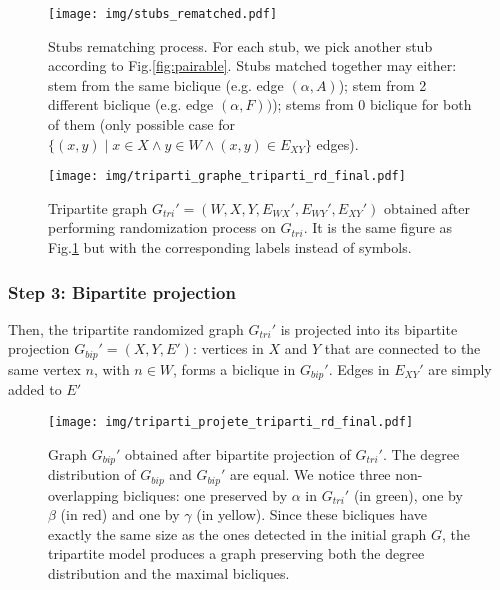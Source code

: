 \documentclass[table]{report}
\begin{document}
\begin{figure}[h]%
\centering
\texttt{[image: img/stubs\_rematched.pdf]}
\caption{Stubs rematching process. For each stub, we pick another stub according to Fig.\ref{fig:pairable}. Stubs matched together may either: stem from the same biclique (e.g. edge $(\alpha,A)$); stem from 2 different biclique (e.g. edge $(\alpha,F))$); stems from 0 biclique for both of them (only possible case for $\{(x,y) \mid x \in X \wedge y \in W \wedge (x,y) \in E_{XY}\}$ edges). }
\label{fig:stubs_rematched}
\end{figure}
\FloatBarrier


\begin{figure}[h]%
\centering
\texttt{[image: img/triparti\_graphe\_triparti\_rd\_final.pdf]}
\caption{Tripartite graph ${G_{tri}}'=(W,X,Y,{E_{WX}}',{E_{WY}}',{E_{XY}}')$ obtained after performing randomization process on $G_{tri}$. It is the same figure as Fig.\ref{fig:stubs_rematched} but with the corresponding labels instead of symbols.}
\label{fig:graphs}
\end{figure}
\FloatBarrier

\subsubsection{Step 3: Bipartite projection}

Then, the tripartite randomized graph ${G_{tri}}'$ is projected into its bipartite projection ${G_{bip}}'=(X,Y,E')$: vertices in $X$ and $Y$ that are connected to the same vertex $n$, with $n \in W$, forms a biclique in ${G_{bip}}'$. Edges in ${E_{XY}}'$ are simply added to $E'$

\begin{figure}[h]%
\centering
\texttt{[image: img/triparti\_projete\_triparti\_rd\_final.pdf]}
\caption{Graph ${G_{bip}}'$ obtained after bipartite projection of ${G_{tri}}'$. The degree distribution of ${G_{bip}}$ and ${G_{bip}}'$ are equal. We notice three non-overlapping bicliques: one preserved by $\alpha$ in ${G_{tri}}'$ (in green), one by $\beta$ (in red) and one by $\gamma$ (in yellow). Since these bicliques have exactly the same size as the ones detected in the initial graph $G$, the tripartite model produces a graph preserving both the degree distribution and the maximal bicliques.}
\label{fig:graphs}
\end{figure}
\FloatBarrier
\end{document}
